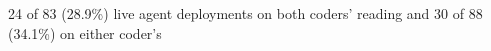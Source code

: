 24 of 83 (28.9\%) live agent deployments on both coders' reading and 30 of 88 (34.1\%) on either coder's